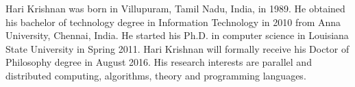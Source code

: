 Hari Krishnan was born in Villupuram, Tamil Nadu, India, in 1989. He obtained his bachelor of technology degree in Information Technology in 2010 from Anna University, Chennai, India. He started his Ph.D. in computer science in Louisiana State University in Spring 2011. Hari Krishnan will formally receive his Doctor of Philosophy degree in August 2016. His research interests are parallel and distributed computing, algorithms, theory and programming languages.